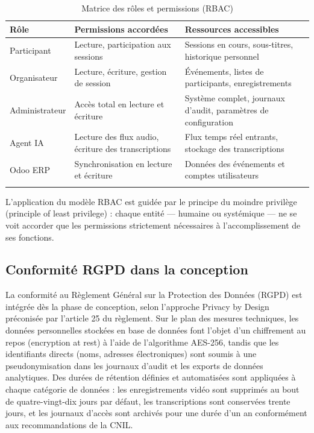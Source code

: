 \begin{longtable}{|m{2.5cm}|m{5.5cm}|m{5cm}|}
\hline
\textbf{Rôle} & \textbf{Permissions accordées} & \textbf{Ressources accessibles} \\
\hline
\endhead
\endfoot
\endlastfoot
\hline
Participant & Lecture, participation aux sessions & Sessions en cours, sous-titres, historique personnel \\
\hline
Organisateur & Lecture, écriture, gestion de session & Événements, listes de participants, enregistrements \\
\hline
Administrateur & Accès total en lecture et écriture & Système complet, journaux d'audit, paramètres de configuration \\
\hline
Agent IA & Lecture des flux audio, écriture des transcriptions & Flux temps réel entrants, stockage des transcriptions \\
\hline
Odoo ERP & Synchronisation en lecture et écriture & Données des événements et comptes utilisateurs \\
\hline
\captionsetup{justification=centering,margin=2cm}
\caption{Matrice des rôles et permissions (RBAC)}
\label{tab:rbac}
\end{longtable}

L'application du modèle RBAC est guidée par le principe du moindre privilège (principle of least privilege) : chaque entité — humaine ou systémique — ne se voit accorder que les permissions strictement nécessaires à l'accomplissement de ses fonctions.

\subsection{Conformité RGPD dans la conception}
La conformité au Règlement Général sur la Protection des Données (RGPD) est intégrée dès la phase de conception, selon l'approche Privacy by Design préconisée par l'article 25 du règlement. Sur le plan des mesures techniques, les données personnelles stockées en base de données font l'objet d'un chiffrement au repos (encryption at rest) à l'aide de l'algorithme AES-256, tandis que les identifiants directs (noms, adresses électroniques) sont soumis à une pseudonymisation dans les journaux d'audit et les exports de données analytiques. Des durées de rétention définies et automatisées sont appliquées à chaque catégorie de données : les enregistrements vidéo sont supprimés au bout de quatre-vingt-dix jours par défaut, les transcriptions sont conservées trente jours, et les journaux d'accès sont archivés pour une durée d'un an conformément aux recommandations de la CNIL.

